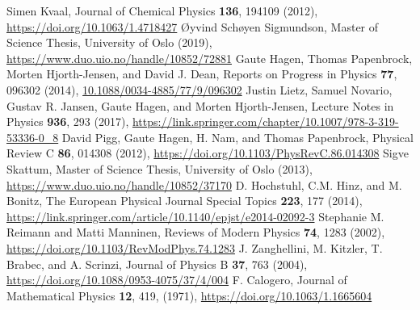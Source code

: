 \documentclass{article}
\begin{document}
\begin{thebibliography}{99}

 Simen Kvaal, Journal of Chemical Physics {\bf 136}, 194109 (2012), \url{ https://doi.org/10.1063/1.4718427}
 Øyvind Schøyen Sigmundson, Master of Science Thesis, University of Oslo (2019), \url{https://www.duo.uio.no/handle/10852/72881}
 Gaute Hagen, Thomas Papenbrock, Morten Hjorth-Jensen, and David J. Dean, Reports on Progress in Physics  {\bf 77}, 096302 (2014), \url{10.1088/0034-4885/77/9/096302}
 Justin Lietz, Samuel Novario, Gustav R. Jansen, Gaute Hagen, and Morten Hjorth-Jensen, Lecture Notes in Physics {\bf 936}, 293 (2017), \url{https://link.springer.com/chapter/10.1007/978-3-319-53336-0_8}
 David Pigg, Gaute Hagen, H. Nam, and Thomas Papenbrock, Physical Review C {\bf 86}, 014308 (2012), \url{https://doi.org/10.1103/PhysRevC.86.014308}
 Sigve Skattum, Master of Science Thesis, University of Oslo (2013), \url{https://www.duo.uio.no/handle/10852/37170}  
 D. Hochstuhl, C.M. Hinz, and M. Bonitz, The European Physical Journal Special Topics {\bf 223}, 177 (2014), \url{https://link.springer.com/article/10.1140/epjst/e2014-02092-3}
 Stephanie M. Reimann and Matti Manninen, Reviews of  Modern Physics {\bf 74}, 1283 (2002), \url{https://doi.org/10.1103/RevModPhys.74.1283}
 J. Zanghellini, M. Kitzler, T. Brabec, and A. Scrinzi, Journal of Physics  B {\bf 37}, 763 (2004), \url{https://doi.org/10.1088/0953-4075/37/4/004}
 F. Calogero, Journal of Mathematical Physics {\bf 12}, 419,  (1971), \url{https://doi.org/10.1063/1.1665604}

\end{thebibliography}  
\end{document}
